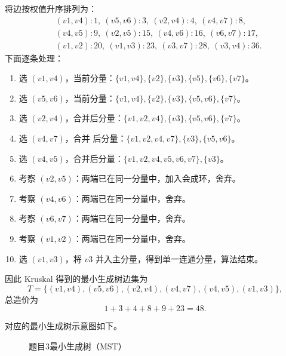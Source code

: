 \documentclass[utf8]{ctexart}
\theoremstyle{mystyle}
\begin{document}
将边按权值升序排列为：
\[
\begin{aligned}
&(v1,v4):1,\ (v5,v6):3,\ (v2,v4):4,\ (v4,v7):8,\\
&(v4,v5):9,\ (v2,v5):15,\ (v4,v6):16,\ (v6,v7):17,\\
&(v1,v2):20,\ (v1,v3):23,\ (v3,v7):28,\ (v3,v4):36.
\end{aligned}
\]
下面逐条处理：
\begin{enumerate}
  \item 选 $(v1,v4)$，当前分量：$\{v1,v4\},\{v2\},\{v3\},\{v5\},\{v6\},\{v7\}$。
  \item 选 $(v5,v6)$，当前分量：$\{v1,v4\},\{v2\},\{v3\},\{v5,v6\},\{v7\}$。
  \item 选 $(v2,v4)$，合并后分量：$\{v1,v2,v4\},\{v3\},\{v5,v6\},\{v7\}$。
  \item 选 $(v4,v7)$，合并 后分量：$\{v1,v2,v4,v7\},\{v3\},\{v5,v6\}$。
  \item 选 $(v4,v5)$，合并后分量：$\{v1,v2,v4,v5,v6,v7\},\{v3\}$。
  \item 考察 $(v2,v5)$：两端已在同一分量中，加入会成环，舍弃。
  \item 考察 $(v4,v6)$：两端已在同一分量中，舍弃。
  \item 考察 $(v6,v7)$：两端已在同一分量中，舍弃。
  \item 考察 $(v1,v2)$：两端已在同一分量中，舍弃。
  \item 选 $(v1,v3)$，将 $v3$ 并入主分量，得到单一连通分量，算法结束。
\end{enumerate}
因此 Kruskal 得到的最小生成树边集为
\[
T=\{(v1,v4),(v5,v6),(v2,v4),(v4,v7),(v4,v5),(v1,v3)\},
\]
总造价为
\[
1+3+4+8+9+23=48.
\]

对应的最小生成树示意图如下。

\begin{figure}[h]
\centering
{}
\caption{题目3最小生成树（MST）}
\end{figure}
\end{document}
